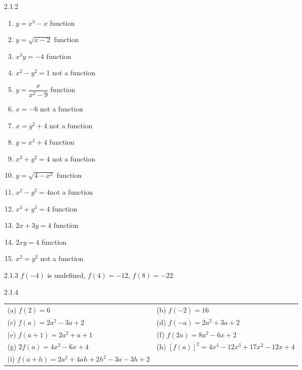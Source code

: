 \begin{Answer}{2.1.2}
\begin{multicols}{2}
	\begin{enumerate}
		\item $y = x^{3} - x$  function
		\item $y = \sqrt{x - 2}$ function
		\item $x^{3}y = -4$  function
		\item $x^{2} - y^{2} = 1$ not a function
		\item $y = \dfrac{x}{x^{2} - 9}$ function
		\item $x = -6$ not a function
		\item  $x = y^2 + 4$ not a function
		\item $y = x^2 + 4$ function
		\item $x^2 + y^2 = 4$ not a function
		\item $y = \sqrt{4-x^2}$ function
		\item $x^2 - y^2 = 4$not a function
		\item $x^3 + y^3 = 4$ function
		\item $2x + 3y = 4$ function
		\item $2xy = 4$ function
		\item $x^2 = y^2$ not a function
	\end{enumerate}
\end{multicols}
\end{Answer}
\begin{Answer}{2.1.3}
	$f(-4)$ is undefined, \hspace{3mm} $f(4)=-12$, \hspace{3mm} $f(8)=-22$
\end{Answer}
\begin{Answer}{2.1.4}
\begin{tabular}{ll}
(a) $f(2)=6$ & (b) $f(-2)=16$ \\
(c) $f(a)=2a^{2}-3a+2$  & (d)  $f(-a)=2a^{2}+3a+2$ \\
(e) $f(a+1)=2a^{2}+a+1$ & (f) $f(2a)=8a^{2}-6x+2$ \\
(g) $2f(a)=4x^{2}-6x+4$ & (h) $\displaystyle{\left[ f(a) \right]^{2}=4x^{4}-12x^{3}+17x^{2}-12x+4}$ \\
(i) $f(a+h)=2a^{2}+4ah+2h^{2}-3a-3h+2$ & \\
\end{tabular}
\end{Answer}
